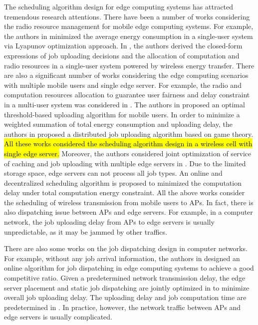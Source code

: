 {    The scheduling algorithm design for edge computing systems has attracted tremendous research attentions.
    There have been a number of works considering the radio resource management for mobile edge computing systems.
    For example, the authors in \text{[1]} minimized the average energy consumption in a single-user system via Lyapunov optimization approach.
    In \text{[2]}, the authors derived the closed-form expressions of job uploading decisions and the allocation of computation and radio resources in a single-user system powered by wireless energy transfer.
    There are also a significant number of works considering the edge computing scenarios with multiple mobile users and single edge server.
        For example, the radio and computation resources allocation to guarantee user fairness and delay constraint in a multi-user system was considered in \text{[3]}.
        The authors in \text{[4]} proposed an optimal threshold-based uploading algorithm for mobile users.
        In order to minimize a weighted summation of total energy consumption and uploading delay, the authors in \text{[5]} proposed a distributed job uploading algorithm based on game theory.
        \hl{All these works considered the scheduling algorithm design in a wireless cell with single edge server.}
    Moreover, the authors considered joint optimization of service of caching and job uploading with multiple edge servers in \text{[6]}. Due to the limited storage space, edge servers can not process all job types.
    An online and decentralized scheduling algorithm is proposed to minimized the computation delay under total computation energy constraint.
    All the above works consider the scheduling of wireless transmission from mobile users to APs. In fact, there is also dispatching issue between APs and edge servers.
    For example, in a computer network, the job uploading delay from APs to edge servers is usually unpredictable, as it may be jammed by other traffics.

    There are also some works on the job dispatching design in computer networks.
    For example, without any job arrival information, the authors in \text{[7]} designed an online algorithm for job dispatching in edge computing systems to achieve a good competitive ratio.
    Given a predetermined network transmission delay, the edge server placement and static job dispatching are jointly optimized in \text{[8]} to minimize overall job uploading delay. The uploading delay and job computation time are predetermined in \text{[7,8]}.
    In practice, however, the network traffic between APs and edge servers is usually complicated.

}

